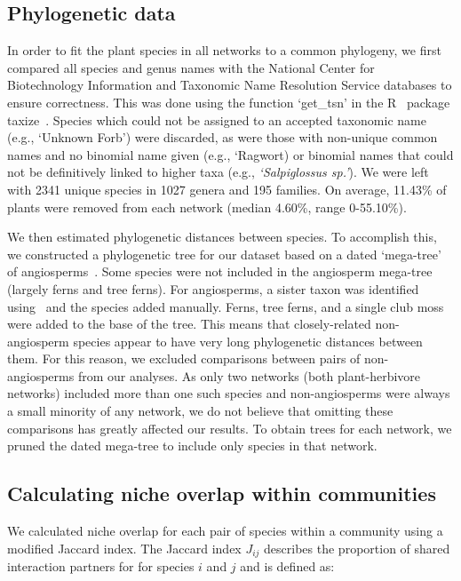 \documentclass[12pt]{article}
\begin{document}
\begin{spacing}{1.5}
\subsection*{Phylogenetic data}

  In order to fit the plant species in all networks to a common phylogeny, 
  we first compared all species and genus names with the 
  National Center for Biotechnology Information
  and Taxonomic Name Resolution Service databases to ensure
  correctness. This was done using the function `get\_tsn' in the R~\citep{R}
  package taxize~\citep{taxize1,taxize2}. Species which could not 
  be assigned to an accepted taxonomic name (e.g., `Unknown Forb') were 
  discarded, as were those with non-unique common names and no binomial 
  name given (e.g., `Ragwort) or binomial names that could not be definitively 
  linked to  higher taxa (e.g., \emph{`Salpiglossus sp.'}). We were left with 
  2341 unique species in 1027 genera and 195 families. On average, 11.43\% of 
  plants were removed from each network (median 4.60\%, range 0-55.10\%).


  We then estimated phylogenetic distances between species. To accomplish 
  this, we constructed a phylogenetic tree for our dataset based on a dated
  `mega-tree' of angiosperms~\citep{Zanne2014}. Some species were not included
  in the angiosperm mega-tree (largely ferns and tree ferns). For angiosperms,
  a sister taxon was identified using~\citet{APW} and the species added manually.
  Ferns, tree ferns, and a single club moss were added to the base of the tree.
  This means that closely-related non-angiosperm species appear to have very long 
  phylogenetic distances between them. For this reason, we excluded comparisons 
  between pairs of non-angiosperms from our analyses. As only two networks (both 
  plant-herbivore networks) included more than one such species and non-angiosperms
  were always a small minority of any network, we do not 
  believe that omitting these comparisons has greatly affected our results.
  To obtain trees for each network, we 
  pruned the dated mega-tree to include only species in that network.


\subsection*{Calculating niche overlap within communities}

  We calculated niche overlap for each pair of species within
  a community using a modified Jaccard index. The 
  Jaccard index $J_{ij}$ describes the proportion of shared interaction 
  partners for for species $i$ and $j$ and is defined as: 


\end{spacing}
\end{document}
